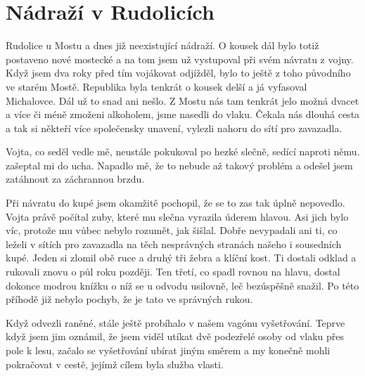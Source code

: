 
\chapter{Nádraží v Rudolicích}

Rudolice u Mostu a dnes již neexistující nádraží. O kousek dál bylo totiž
postaveno nové mostecké a na tom jsem už vystupoval při svém návratu z vojny.
Když jsem dva roky před tím vojákovat odjížděl, bylo to ještě z toho původního
ve starém Mostě. Republika byla tenkrát o kousek delší a já vyfasoval
Michalovce. Dál už to snad ani nešlo. Z Mostu nás tam tenkrát jelo možná dvacet
a více či méně zmoženi alkoholem, jsme nasedli do vlaku. Čekala nás dlouhá
cesta a tak si někteří více společensky unavení, vylezli nahoru do sítí pro
zavazadla.

Vojta, co seděl vedle mě, neustále pokukoval po hezké slečně, sedící naproti
němu. 
zašeptal mi do ucha. Napadlo mě, že to nebude až takový problém a odešel jsem
zatáhnout za záchrannou brzdu.

Při návratu do kupé jsem okamžitě pochopil, že se to zas tak úplně nepovedlo.
Vojta právě počítal zuby, které mu slečna vyrazila úderem hlavou. Asi jich bylo
víc, protože mu vůbec nebylo rozumět, jak šišlal. Dobře nevypadali ani ti, co
leželi v sítích pro zavazadla na těch nesprávných stranách našeho i sousedních
kupé. Jeden si zlomil obě ruce a druhý tři žebra a klíční kost. Ti dostali
odklad a rukovali znovu o půl roku později. Ten třetí, co spadl rovnou na
hlavu, dostal dokonce modrou knížku o níž se u odvodu usilovně, leč bezúspěšně
snažil. Po této příhodě již nebylo pochyb, že je tato ve správných rukou.

Když odvezli raněné, stále ještě probíhalo v našem vagónu vyšetřování. Teprve
když jsem jim oznámil, že jsem viděl utíkat dvě podezřelé osoby od vlaku přes
pole k lesu, začalo se vyšetřování ubírat jiným směrem a my konečně mohli
pokračovat v cestě, jejímž cílem byla služba vlasti.
